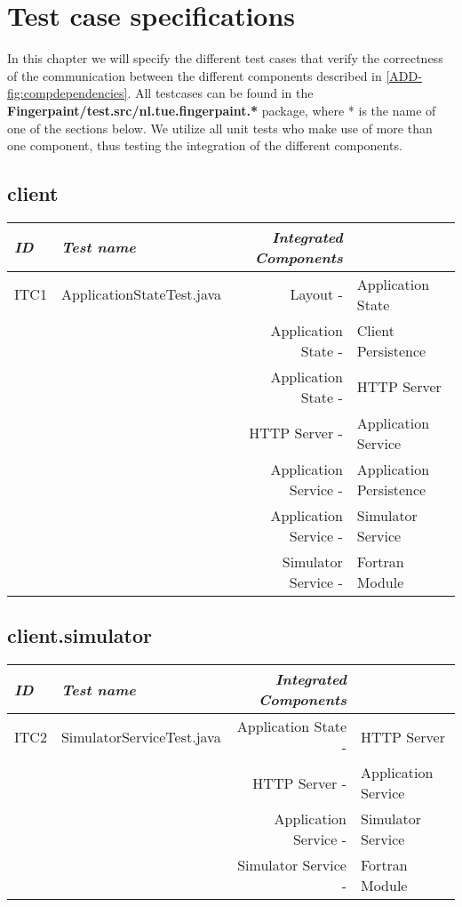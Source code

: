\chapter{Test case specifications}
\label{chap:testCaseSpecs}

In this chapter we will specify the different test cases that verify the correctness of the communication between the different components described in \ref{ADD-fig:compdependencies}. All testcases can be found in the \textbf{Fingerpaint/test.src/nl.tue.fingerpaint.*} package, where * is the name of one of the sections below. We utilize all unit tests who make use of more than one component, thus testing the integration of the different components.


\section{client}
\begin{tabular}{llrl}
\emph{ID} & \emph{Test name} & \emph{Integrated Components} & \\
\hline
ITC1 & ApplicationStateTest.java & Layout - & Application State \\
& & Application State - & Client Persistence \\
& & Application State - & HTTP Server \\
& & HTTP Server - & Application Service \\
& & Application Service - & Application Persistence\\
& & Application Service - & Simulator Service\\
& & Simulator Service - & Fortran Module \\
\end{tabular}

\section{client.simulator}
\begin{tabular}{llrl}
\emph{ID} & \emph{Test name} & \emph{Integrated Components} & \\
\hline
ITC2 & SimulatorServiceTest.java & Application State - & HTTP Server \\
& & HTTP Server - & Application Service \\
& & Application Service - & Simulator Service \\
& & Simulator Service - & Fortran Module\\
\end{tabular}

